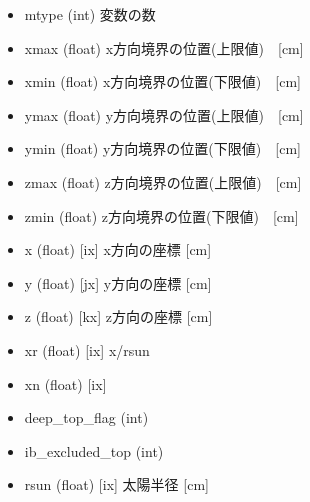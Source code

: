 \documentclass[letterpaper,10pt,dvipdfmx,report]{sphinxmanual}
\begin{document}
\begin{itemize}
\item {} 
mtype (int) \sphinxhyphen{}\sphinxhyphen{} 変数の数

\item {} 
xmax (float) \sphinxhyphen{}\sphinxhyphen{} x方向境界の位置(上限値)　{[}cm{]}

\item {} 
xmin (float) \sphinxhyphen{}\sphinxhyphen{} x方向境界の位置(下限値)　{[}cm{]}

\item {} 
ymax (float) \sphinxhyphen{}\sphinxhyphen{} y方向境界の位置(上限値)　{[}cm{]}

\item {} 
ymin (float) \sphinxhyphen{}\sphinxhyphen{} y方向境界の位置(下限値)　{[}cm{]}

\item {} 
zmax (float) \sphinxhyphen{}\sphinxhyphen{} z方向境界の位置(上限値)　{[}cm{]}

\item {} 
zmin (float) \sphinxhyphen{}\sphinxhyphen{} z方向境界の位置(下限値)　{[}cm{]}

\item {} 
x (float) {[}ix{]} \sphinxhyphen{}\sphinxhyphen{} x方向の座標 {[}cm{]}

\item {} 
y (float) {[}jx{]} \sphinxhyphen{}\sphinxhyphen{} y方向の座標 {[}cm{]}

\item {} 
z (float) {[}kx{]} \sphinxhyphen{}\sphinxhyphen{} z方向の座標 {[}cm{]}

\item {} 
xr (float) {[}ix{]} \sphinxhyphen{}\sphinxhyphen{} x/rsun

\item {} 
xn (float) {[}ix{]} \sphinxhyphen{}\sphinxhyphen{} 

\item {} 
deep\_top\_flag (int) \sphinxhyphen{}\sphinxhyphen{}

\item {} 
ib\_excluded\_top (int) \sphinxhyphen{}\sphinxhyphen{}

\item {} 
rsun (float) {[}ix{]} \sphinxhyphen{}\sphinxhyphen{} 太陽半径 {[}cm{]}

\end{itemize}
\end{document}
